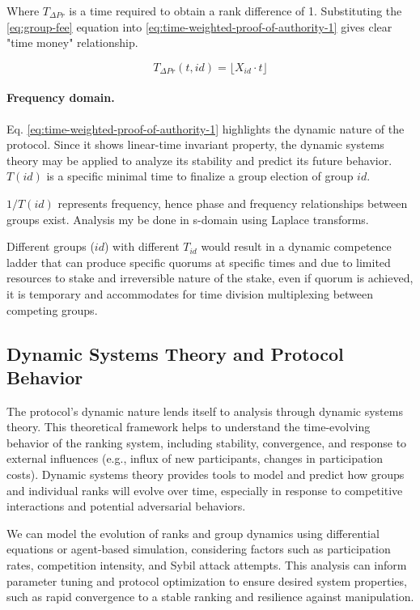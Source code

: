 \documentclass{article}
\begin{document}
\begin{CJK}{UTF8}{gbsn}
    Where $T_{\Delta Pr}$ is a time required to obtain a rank difference of 1. Substituting  the \ref{eq:group-fee} equation into \ref{eq:time-weighted-proof-of-authority-1} gives clear "time money" relationship.

    \begin{equation}
        \label{eq:time-weighted-proof-of-authority-2}
        T_{\Delta Pr}(t,id) = \lfloor X_{id} \cdot t \rfloor
    \end{equation}

    \paragraph*{Frequency domain.} Eq. \ref{eq:time-weighted-proof-of-authority-1} highlights the dynamic nature of the protocol. Since it shows linear-time invariant property, the dynamic systems theory \cite{Lynn86} may be applied to analyze its stability and predict its future behavior. ${T(id)}$ is a specific minimal time to finalize a group election of group ${id}$.

    $1/T(id)$ represents frequency, hence phase and frequency relationships between groups exist. Analysis my be done in s-domain using Laplace transforms.

    Different groups (${id}$) with different ${T_{id}}$ would result in a dynamic competence ladder that can produce specific quorums at specific times and due to limited resources to stake and irreversible nature of the stake, even if quorum is achieved, it is temporary and accommodates for time division multiplexing between competing groups.

    \subsection{Dynamic Systems Theory and Protocol Behavior}

    The protocol's dynamic nature lends itself to analysis through dynamic systems theory.  {{ This theoretical framework helps to understand the time-evolving behavior of the ranking system, including stability, convergence, and response to external influences (e.g., influx of new participants, changes in participation costs).  Dynamic systems theory provides tools to model and predict how groups and individual ranks will evolve over time, especially in response to competitive interactions and potential adversarial behaviors. }}

    We can model the evolution of ranks and group dynamics using differential equations or agent-based simulation, considering factors such as participation rates, competition intensity, and Sybil attack attempts. This analysis can inform parameter tuning and protocol optimization to ensure desired system properties, such as rapid convergence to a stable ranking and resilience against manipulation.


\end{CJK}
\end{document}
